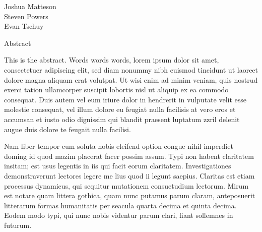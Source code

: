 \documentclass{article}
\begin{document}
    \setlength{\parindent}{0pt}
    \setlength{\parskip}{0pt}
\begingroup\flushleft
  Joshua Matteson\\
  Steven Powers\\
  Evan Tschuy
\endgroup

\vspace{1pc}
\centerline{\sc \large Abstract}
\vspace{2pc}

\hspace{10mm}This is the abstract. Words words words, lorem ipsum dolor sit amet,
consectetuer adipiscing elit, sed diam nonummy nibh euismod tincidunt ut laoreet
dolore magna aliquam erat volutpat. Ut wisi enim ad minim veniam, quis nostrud
exerci tation ullamcorper suscipit lobortis nisl ut aliquip ex ea commodo
consequat. Duis autem vel eum iriure dolor in hendrerit in vulputate velit esse
molestie consequat, vel illum dolore eu feugiat nulla facilisis at vero eros et
accumsan et iusto odio dignissim qui blandit praesent luptatum zzril delenit
augue duis dolore te feugait nulla facilisi.

\hspace{10mm}Nam liber tempor cum soluta nobis
eleifend option congue nihil imperdiet doming id quod mazim placerat facer possim
assum. Typi non habent claritatem insitam; est usus legentis in iis qui facit
eorum claritatem. Investigationes demonstraverunt lectores legere me lius quod
ii legunt saepius. Claritas est etiam processus dynamicus, qui sequitur
mutationem consuetudium lectorum. Mirum est notare quam littera gothica, quam
nunc putamus parum claram, anteposuerit litterarum formas humanitatis per seacula
quarta decima et quinta decima. Eodem modo typi, qui nunc nobis videntur parum
clari, fiant sollemnes in futurum.
\end{document}
